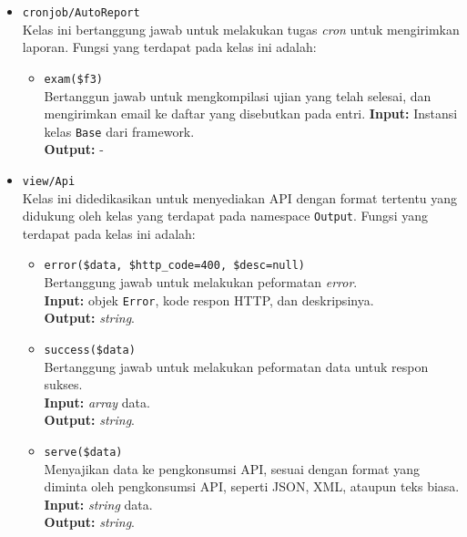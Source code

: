 \begin{itemize}
        \item \texttt{cronjob/AutoReport} \\
            Kelas ini bertanggung jawab untuk melakukan tugas \textit{cron} untuk mengirimkan
            laporan.
            Fungsi yang terdapat pada kelas ini adalah:
            \begin{itemize}
                \item \texttt{exam(\$f3)} \\
                    Bertanggun jawab untuk mengkompilasi ujian yang telah selesai, dan mengirimkan
                    email ke daftar yang disebutkan pada entri.
                    \textbf{Input:} Instansi kelas \texttt{Base} dari framework.\\
                    \textbf{Output:} -
            \end{itemize}
            
        \item \texttt{view/Api} \\
            Kelas ini didedikasikan untuk menyediakan API dengan format tertentu yang didukung oleh
            kelas yang terdapat pada namespace \texttt{Output}.
            Fungsi yang terdapat pada kelas ini adalah:
            \begin{itemize}
                \item \texttt{error(\$data, \$http\_code=400, \$desc=null)} \\
                    Bertanggung jawab untuk melakukan peformatan \textit{error}. \\
                    \textbf{Input:} objek \texttt{Error}, kode respon HTTP, dan deskripsinya.\\
                    \textbf{Output:} \textit{string}.
                    
                \item \texttt{success(\$data)} \\
                    Bertanggung jawab untuk melakukan peformatan data untuk respon sukses. \\
                    \textbf{Input:} \textit{array} data.\\
                    \textbf{Output:} \textit{string}.
                
                \item \texttt{serve(\$data)} \\
                    Menyajikan data ke pengkonsumsi API, sesuai dengan format yang diminta oleh
                    pengkonsumsi API, seperti JSON, XML, ataupun teks biasa.\\
                    \textbf{Input:} \textit{string} data.\\
                    \textbf{Output:} \textit{string}.
            \end{itemize}
            

\end{itemize}
